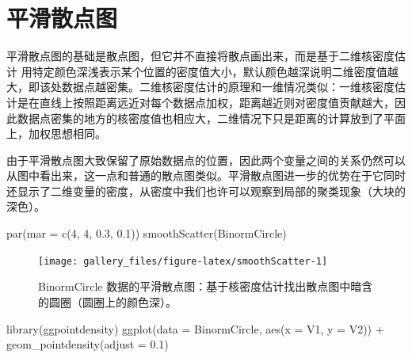 \documentclass[
  b5paper,
  UTF8,twoside]{book}
\newenvironment{Shaded}{\begin{snugshade}}{\end{snugshade}}
\newcommand{\AttributeTok}[1]{\textcolor[rgb]{0.77,0.63,0.00}{#1}}
\newcommand{\DecValTok}[1]{\textcolor[rgb]{0.00,0.00,0.81}{#1}}
\newcommand{\FloatTok}[1]{\textcolor[rgb]{0.00,0.00,0.81}{#1}}
\newcommand{\FunctionTok}[1]{\textcolor[rgb]{0.00,0.00,0.00}{#1}}
\newcommand{\NormalTok}[1]{#1}
\newcommand{\SpecialCharTok}[1]{\textcolor[rgb]{0.00,0.00,0.00}{#1}}
\begin{document}
\hypertarget{sec:smoothScatter}{%
\section{平滑散点图}\label{sec:smoothScatter}}

平滑散点图的基础是散点图，但它并不直接将散点画出来，而是基于二维核密度估计 \citep{KernSmooth} 用特定颜色深浅表示某个位置的密度值大小，默认颜色越深说明二维密度值越大，即该处数据点越密集。二维核密度估计的原理和一维情况类似：一维核密度估计是在直线上按照距离远近对每个数据点加权，距离越近则对密度值贡献越大，因此数据点密集的地方的核密度值也相应大，二维情况下只是距离的计算放到了平面上，加权思想相同。

由于平滑散点图大致保留了原始数据点的位置，因此两个变量之间的关系仍然可以从图中看出来，这一点和普通的散点图类似。平滑散点图进一步的优势在于它同时还显示了二维变量的密度，从密度中我们也许可以观察到局部的聚类现象（大块的深色）。





\begin{Shaded}
\begin{Highlighting}[]
\FunctionTok{par}\NormalTok{(}\AttributeTok{mar =} \FunctionTok{c}\NormalTok{(}\DecValTok{4}\NormalTok{, }\DecValTok{4}\NormalTok{, }\FloatTok{0.3}\NormalTok{, }\FloatTok{0.1}\NormalTok{))}
\FunctionTok{smoothScatter}\NormalTok{(BinormCircle)}
\end{Highlighting}
\end{Shaded}

\begin{figure}

{\centering \texttt{[image: gallery\_files/figure-latex/smoothScatter-1]} 

}

\caption[BinormCircle 数据的平滑散点图]{BinormCircle 数据的平滑散点图：基于核密度估计找出散点图中暗含的圆圈（圆圈上的颜色深）。}\label{fig:smoothScatter}
\end{figure}

\begin{Shaded}
\begin{Highlighting}[]
\FunctionTok{library}\NormalTok{(ggpointdensity)}
\FunctionTok{ggplot}\NormalTok{(}\AttributeTok{data =}\NormalTok{ BinormCircle, }\FunctionTok{aes}\NormalTok{(}\AttributeTok{x =}\NormalTok{ V1, }\AttributeTok{y =}\NormalTok{ V2)) }\SpecialCharTok{+}
  \FunctionTok{geom\_pointdensity}\NormalTok{(}\AttributeTok{adjust =} \FloatTok{0.1}\NormalTok{)}
\end{Highlighting}
\end{Shaded}
\end{document}
